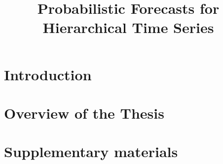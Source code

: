 \documentclass[a4paper, 11pt]{article} %
\title{Probabilistic Forecasts for Hierarchical Time Series}
\begin{document}
\def\spacingset#1{\renewcommand{\baselinestretch}%
	{#1}\small\normalsize} \spacingset{1}





\newpage
{}
\setcounter{page}{1}

%
\section{Introduction}

\section{Overview of the Thesis}



%
\section*{Supplementary materials}

\newpage

\printbibliography
\end{document}

